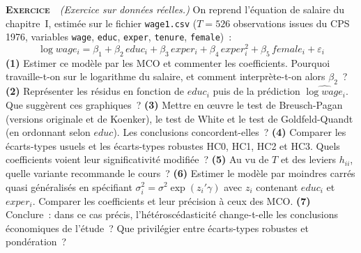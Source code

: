 \documentclass[10pt,a4paper,notitlepage]{article}
\newcounter{xnumber}
\newcommand{\exercice}{\refstepcounter{xnumber}\textsc{\textbf{Exercice}} \textbf{\thexnumber}\,\,}
\newcommand{\question}[1]{\textbf{(#1)}}
\begin{document}
\bigskip

\exercice\label{ex:salaire} \emph{(Exercice sur données réelles.)} On reprend l'équation de
salaire du chapitre~I, estimée sur le fichier \texttt{wage1.csv}
($T = 526$ observations issues du CPS 1976, variables \texttt{wage},
\texttt{educ}, \texttt{exper}, \texttt{tenure}, \texttt{female})~:
\[
  \log wage_i = \beta_1 + \beta_2\, educ_i + \beta_3\, exper_i
              + \beta_4\, exper_i^2 + \beta_5\, female_i + \varepsilon_i
\]
\question{1} Estimer ce modèle par les MCO et commenter les coefficients.
Pourquoi travaille-t-on sur le logarithme du salaire, et comment interprète-t-on
alors $\beta_2$~? \question{2} Représenter les résidus en fonction de
$educ_i$ puis de la prédiction $\widehat{\log wage_i}$. Que suggèrent ces
graphiques~? \question{3} Mettre en œuvre le test de Breusch-Pagan (versions
originale et de Koenker), le test de White et le test de Goldfeld-Quandt (en
ordonnant selon $educ$). Les conclusions concordent-elles~? \question{4}
Comparer les écarts-types usuels et les écarts-types robustes HC0, HC1, HC2
et HC3. Quels coefficients voient leur significativité modifiée~? \question{5}
Au vu de $T$ et des leviers $h_{ii}$, quelle variante recommande le cours~?
\question{6} Estimer le modèle par moindres carrés quasi généralisés en
spécifiant $\sigma_i^2 = \sigma^2\exp(z_i'\gamma)$ avec $z_i$ contenant
$educ_i$ et $exper_i$. Comparer les coefficients et leur précision à ceux des
MCO. \question{7} Conclure~: dans ce cas précis, l'hétéroscédasticité
change-t-elle les conclusions économiques de l'étude~? Que privilégier entre
écarts-types robustes et pondération~?\newline

\bigskip
\end{document}
